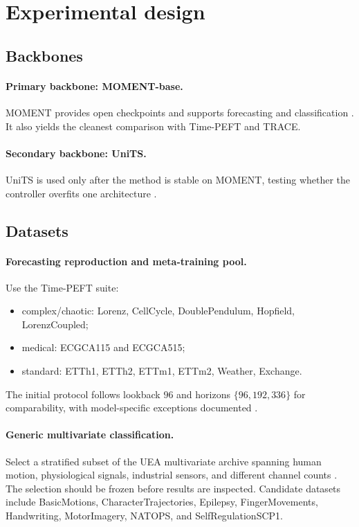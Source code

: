 \documentclass[10pt]{article}
\begin{document}
\section{Experimental design}

\subsection{Backbones}

\paragraph{Primary backbone: MOMENT-base.} MOMENT provides open checkpoints and supports forecasting and classification \citep{goswami2024moment}. It also yields the cleanest comparison with Time-PEFT and TRACE.

\paragraph{Secondary backbone: UniTS.} UniTS is used only after the method is stable on MOMENT, testing whether the controller overfits one architecture \citep{gao2024units}.

\subsection{Datasets}

\paragraph{Forecasting reproduction and meta-training pool.}
Use the Time-PEFT suite:
\begin{itemize}[leftmargin=*, itemsep=1pt]
    \item complex/chaotic: Lorenz, CellCycle, DoublePendulum, Hopfield, LorenzCoupled;
    \item medical: ECGCA115 and ECGCA515;
    \item standard: ETTh1, ETTh2, ETTm1, ETTm2, Weather, Exchange.
\end{itemize}
The initial protocol follows lookback $96$ and horizons $\{96,192,336\}$ for comparability, with model-specific exceptions documented \citep{na2026timepeft}.

\paragraph{Generic multivariate classification.}
Select a stratified subset of the UEA multivariate archive spanning human motion, physiological signals, industrial sensors, and different channel counts \citep{bagnall2018uea}. The selection should be frozen before results are inspected. Candidate datasets include BasicMotions, CharacterTrajectories, Epilepsy, FingerMovements, Handwriting, MotorImagery, NATOPS, and SelfRegulationSCP1.
\end{document}
